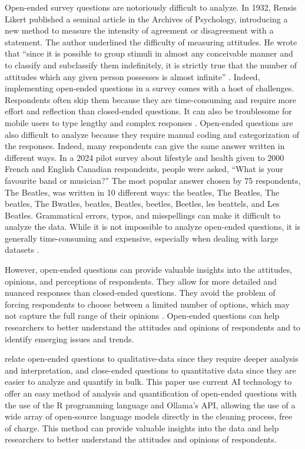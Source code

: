 \documentclass[
  authoryear,
  preprint,
  3p]{elsarticle}
\begin{document}
Open-ended survey questions are notoriously difficult to analyze. In
1932, Rensis Likert published a seminal article in the Archives of
Psychology, introducing a new method to measure the intensity of
agreement or disagreement with a statement. The author underlined the
difficulty of measuring attitudes. He wrote that ``since it is possible
to group stimuli in almost any conceivable manner and to classify and
subclassify them indefinitely, it is strictly true that the number of
attitudes which any given person possesses is almost infinite''
\citep{likert32}. Indeed, implementing open-ended questions in a survey
comes with a host of challenges. Respondents often skip them because
they are time-consuming and require more effort and reflection than
closed-ended questions. It can also be troublesome for mobile users to
type lengthy and complex responses \citep{dillman_etal14}. Open-ended
questions are also difficult to analyze because they require manual
coding and categorization of the responses. Indeed, many respondents can
give the same answer written in different ways. In a 2024 pilot survey
about lifestyle and health given to 2000 French and English Canadian
respondents, people were asked, ``What is your favourite band or
musician?'' The most popular answer chosen by 75 respondents, The
Beatles, was written in 10 different ways: the beatles, The Beatles, The
beatles, The Bwatles, beatles, Beatles, beetles, Beetles, les beattels,
and Les Beatles. Grammatical errors, typos, and misspellings can make it
difficult to analyze the data. While it is not impossible to analyze
open-ended questions, it is generally time-consuming and expensive,
especially when dealing with large datasets
\citep{dillman_etal14, bradburn_etal04}.

However, open-ended questions can provide valuable insights into the
attitudes, opinions, and perceptions of respondents. They allow for more
detailed and nuanced responses than closed-ended questions. They avoid
the problem of forcing respondents to choose between a limited number of
options, which may not capture the full range of their opinions
\citep{dillman_etal14}. Open-ended questions can help researchers to
better understand the attitudes and opinions of respondents and to
identify emerging issues and trends.

\citet{bickman_rog09} relate open-ended questions to qualitative-data
since they require deeper analysis and interpretation, and close-ended
questions to quantitative data since they are easier to analyze and
quantify in bulk. This paper use current AI technology to offer an easy
method of analysis and quantification of open-ended questions with the
use of the R programming language and Ollama's API, allowing the use of
a wide array of open-source language models directly in the cleaning
process, free of charge. This method can provide valuable insights into
the data and help researchers to better understand the attitudes and
opinions of respondents.
\end{document}
